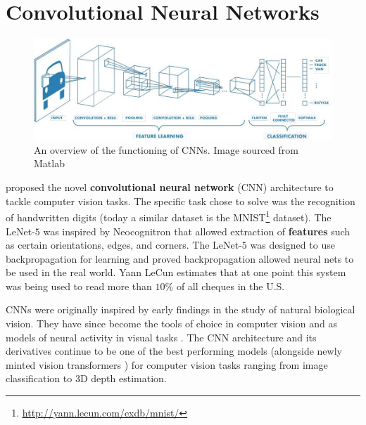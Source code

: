 
\usetikzlibrary{calc,shapes,positioning}

\chapter{Convolutional Neural Networks}\label{chap:cnn}


\begin{figure}[ht]
    \captionsetup{justification=centering}
    \centering
    \includegraphics[width=\textwidth]{chapters/assets/cnn.jpg}
    \caption{An overview of the functioning of CNNs. Image sourced from Matlab\protect\footnotemark}
    \label{fig:cnn-overview}
\end{figure}
\citeauthor{LeCun1989} proposed the novel \textbf{convolutional neural network} (CNN) architecture to tackle computer vision tasks. The specific task \citeauthor{LeCun1989} chose to solve was the recognition of handwritten digits (today a similar dataset is the MNIST\footnote{\url{http://yann.lecun.com/exdb/mnist/}} dataset). The LeNet-$5$ \parencite{LeCun1989} was inspired by Neocognitron \parencite{Fukushima1975, fukushima1982neocognitron} that allowed extraction of \textbf{features} such as certain orientations, edges, and corners. The LeNet-$5$ was designed to use backpropagation for learning and proved backpropagation allowed neural nets to be used in the real world. Yann LeCun estimates that at one point this system was being used to read more than $10\%$ of all cheques in the U.S\parencite{chow_2021}.

CNNs were originally inspired by early findings in the study of natural biological vision. They have since become the tools of choice in computer vision and as models of neural activity in visual tasks \parencite{Kuzovkin2018, Lindsay2021, Eickenberg2017}. The CNN architecture and its derivatives continue to be one of the best performing models (alongside newly minted vision transformers \parencite{Dosovitskiy2020}) for computer vision tasks ranging from image classification to 3D depth estimation.

